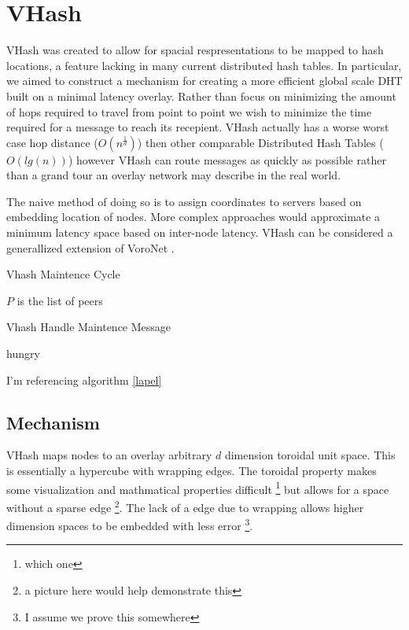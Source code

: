 \documentclass[11pt]{IEEEtran} %
\begin{document}
\section{VHash}
VHash was created to allow for spacial respresentations to be mapped to hash locations, a feature lacking in many current distributed hash tables.  In particular, we aimed to construct a mechanism for creating a more efficient global scale DHT built on a minimal latency overlay. Rather than focus on minimizing the amount of hops required to travel from point to point we wish to minimize the time required for a message to reach its recepient. VHash actually has a worse worst case hop distance ($O(n^{\frac{1}{d}})$) then other comparable Distributed Hash Tables ($O(lg(n))$) however VHash can route messages as quickly as possible rather than a grand tour an overlay network may describe in the real world.

The naive method of doing so is to assign coordinates to servers based on embedding location of nodes. More complex approaches would approximate a minimum latency space based on inter-node latency. VHash can be considered  a generallized extension of VoroNet \cite{voronet}.



\begin{algorithm}
\caption{Vhash Maintence Cycle}
\label{maintence}
\begin{algorithmic}[0]  %
	\STATE $P$ is the list of peers
    
\end{algorithmic}
\end{algorithm}

\begin{algorithm}
\caption{Vhash Handle Maintence Message}
\label{handelmaintence}
\begin{algorithmic}[0]  %
	\STATE hungry
\end{algorithmic}
\end{algorithm}


I'm referencing algorithm \ref{lapel}

\subsection{Mechanism}
VHash maps nodes to an overlay arbitrary $d$ dimension toroidal unit space. This is essentially a hypercube with wrapping edges. The toroidal property makes some visualization and mathmatical properties difficult \footnote{which one} but allows for a space without a sparse edge  \footnote{a picture here would help demonstrate this}.  The lack of a edge due to wrapping allows higher dimension spaces to be embedded with less error \footnote{I assume we prove this somewhere}.
\end{document}
